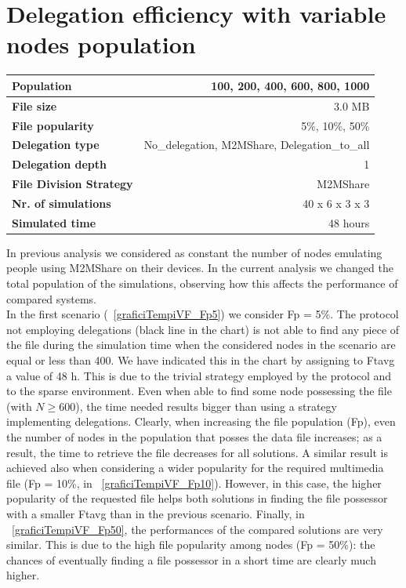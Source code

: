 \section{Delegation efficiency with variable nodes population}
\begin{table}[h]
\begin{center}
\begin{tabular}{|l|r|}
\hline
\bfseries Population & 100, 200, 400, 600, 800, 1000 \\
\hline
\bfseries File size & 3.0 MB \\
\hline
\bfseries File popularity & 5\%, 10\%, 50\% \\
\hline
\bfseries Delegation type & No\_delegation, M2MShare, Delegation\_to\_all \\
\hline
\bfseries Delegation depth & 1 \\
\hline
\bfseries File Division Strategy & M2MShare \\
\hline
\bfseries Nr. of simulations & 40 x 6 x 3 x 3\\
\hline
\bfseries Simulated time & 48 hours \\
\hline
\end{tabular}
\end{center}
\end{table}
In previous analysis we considered as constant the number of nodes emulating people using M2MShare on their devices. In the current analysis we changed the total population of the simulations, observing how this affects the performance of compared systems.\\

In the first scenario (\figurename~\ref{graficiTempiVF_Fp5}) we consider Fp = 5\%. The protocol not employing delegations (black line in the chart) is not able to find any piece of the file during the simulation time when the considered nodes in the scenario are equal or less than 400. We have indicated this in the chart by assigning to Ftavg a value of 48 h. This is due to the trivial strategy employed by the protocol and to the sparse environment. Even when able to find some node possessing the file (with $N \geq 600$), the time needed results bigger than using a strategy implementing delegations. Clearly, when increasing the file population (Fp), even the number of nodes in the population that posses the data file increases; as a result, the time to retrieve the file decreases for all solutions. A similar result is achieved also when considering a wider popularity for the required multimedia file (Fp = 10\%, in \figurename~\ref{graficiTempiVF_Fp10}). However, in this case, the higher popularity of the requested file helps both solutions in finding the file possessor with a smaller Ftavg than in the previous scenario.  Finally, in \figurename~\ref{graficiTempiVF_Fp50}, the performances of the compared solutions are very similar. This is due to the high file popularity among nodes (Fp = 50\%): the chances of eventually finding a file possessor in a short time are clearly much higher.

